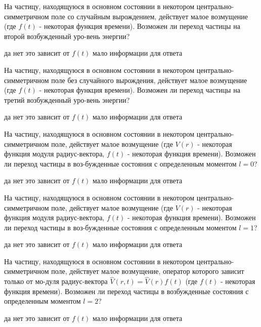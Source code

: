 \documentclass[11pt,a4paper]{exam}
\begin{document}
\begin{questions}
\question На частицу, находящуюся в основном состоянии в некотором центрально-симметричном поле со случайным вырождением, действует малое возмущение  (где $f(t)$ - некоторая функция времени). Возможен ли переход частицы на второй возбужденный уро-вень энергии?  
\begin{choices}
\choice да    
\choice нет      
\choice это зависит от $f(t)$   
\choice мало информации для ответа
\end{choices}

\question На частицу, находящуюся в основном состоянии в некотором центрально-симметричном поле без случайного вырождения, действует малое возмущение  (где $f(t)$ - некоторая функция времени). Возможен ли переход частицы на третий возбужденный уро-вень энергии? 
\begin{choices}
\choice да    
\choice нет      
\choice это зависит от $f(t)$   
\choice мало информации для ответа
\end{choices}

\question На частицу, находящуюся в основном состоянии в некотором центрально-симметричном поле, действует малое возмущение  (где $V(r)$ - некоторая функция модуля радиус-вектора, $f(t)$ - некоторая функция времени). Возможен ли переход частицы в воз-бужденные состояния с определенным моментом $l = 0$? 
\begin{choices}
\choice да    
\choice нет      
\choice это зависит от $f(t)$   
\choice мало информации для ответа
\end{choices}

\question На частицу, находящуюся в основном состоянии в некотором центрально-симметричном поле, действует малое возмущение  (где $V(r)$ - некоторая функция модуля радиус-вектора, $f(t)$ - некоторая функция времени). Возможен ли переход частицы в воз-бужденные состояния с определенным моментом $l = 1$?  
\begin{choices}
\choice да    
\choice нет      
\choice это зависит от $f(t)$   
\choice мало информации для ответа
\end{choices}

\question На частицу, находящуюся в основном состоянии в некотором центрально-симметричном поле, действует малое возмущение, оператор которого зависит только от мо-дуля радиус-вектора $\hat V(r,t) = \hat V(r)f(t)$ (где $f(t)$ - некоторая функция времени). Возможен ли переход частицы в возбужденные состояния с определенным моментом $l = 2$?
\begin{choices}
\choice да    
\choice нет      
\choice это зависит от $f(t)$   
\choice мало информации для ответа
\end{choices}


\end{questions}
\end{document}
